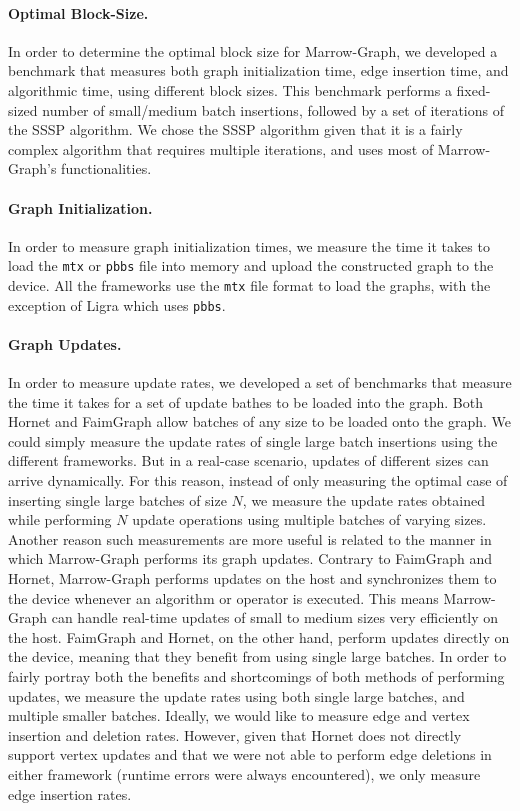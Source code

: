 \paragraph{\textbf{Optimal Block-Size}.} In order to determine the optimal block size for Marrow-Graph, we developed a benchmark that measures both graph initialization time, edge insertion time, and algorithmic time, using different block sizes. This benchmark performs a fixed-sized number of small/medium batch insertions, followed by a set of iterations of the \gls{SSSP} algorithm. We chose the \gls{SSSP} algorithm given that it is a fairly complex algorithm that requires multiple iterations, and uses most of Marrow-Graph's functionalities.

\paragraph{\textbf{Graph Initialization}.} In order to measure graph initialization times, we measure the time it takes to load the \texttt{mtx} or \texttt{pbbs} file into memory and upload the constructed graph to the device. All the frameworks use the \texttt{mtx} file format to load the graphs, with the exception of Ligra which uses \texttt{pbbs}.

\paragraph{\textbf{Graph Updates}.} In order to measure update rates, we developed a set of benchmarks that measure the time it takes for a set of update bathes to be loaded into the graph. Both Hornet and FaimGraph allow batches of any size to be loaded onto the graph. We could simply measure the update rates of single large batch insertions using the different frameworks. But in a real-case scenario, updates of different sizes can arrive dynamically. 
For this reason, instead of only measuring the optimal case of inserting single large batches of size $N$, we measure the update rates obtained while performing $N$ update operations using multiple batches of varying sizes. Another reason such measurements are more useful is related to the manner in which Marrow-Graph performs its graph updates. Contrary to FaimGraph and Hornet, Marrow-Graph performs updates on the host and synchronizes them to the device whenever an algorithm or operator is executed. This means Marrow-Graph can handle real-time updates of small to medium sizes very efficiently on the host. FaimGraph and Hornet, on the other hand, perform updates directly on the device, meaning that they benefit from using single large batches. In order to fairly portray both the benefits and shortcomings of both methods of performing updates, we measure the update rates using both single large batches, and multiple smaller batches. Ideally, we would like to measure edge and vertex insertion and deletion rates. However, given that Hornet does not directly support vertex updates and that we were not able to perform edge deletions in either framework (runtime errors were always encountered), we only measure edge insertion rates.

